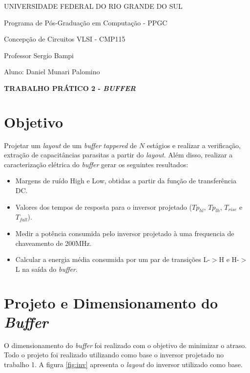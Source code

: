 \documentclass[a4paper,10pt] {article}
\begin{document}
\begin {center}
UNIVERSIDADE FEDERAL DO RIO GRANDE DO SUL

Programa de Pós-Graduação em Computação - PPGC

Concepção de Circuitos VLSI - CMP115

Professor Sergio Bampi

Aluno: Daniel Munari Palomino 

\vspace{7mm}
\textbf{ TRABALHO PRÁTICO 2 - \textit{BUFFER} }
\vspace{7mm}

\end{center}

\section{Objetivo}
Projetar um \textit{layout} de um \textit{buffer} \textit{tappered} de $N$ estágios e realizar a verificação, extração de capacitâncias parasitas a partir do \textit{layout}. Além disso, realizar a caracterização elétrica do \textit{buffer} gerar os seguintes resultados:

\begin{itemize}
\item Margens de ruído High e Low, obtidas a partir da função de transferência DC.
\item Valores dos tempos de resposta para o inversor projetado ($Tp_{hl}$, $Tp_{lh}$, $T_{rise}$ e $T_{fall}$).
\item Medir a potência consumida pelo inversor projetado à uma frequencia de chaveamento de 200MHz.
\item Calcular a energia média consumida por um par de transições L-$>$H e H-$>$L na saída do \textit{buffer}.

\end{itemize}

\section{Projeto e Dimensionamento do \textit{Buffer}}
O dimensionamento do \textit{buffer} foi realizado com o objetivo de minimizar o atraso. Todo o projeto foi realizado utilizando como base o inversor projetado no trabalho 1. A figura \ref{fig:inv} apresenta o \textit{layout} do inversor utilizado como base.
\end{document}
